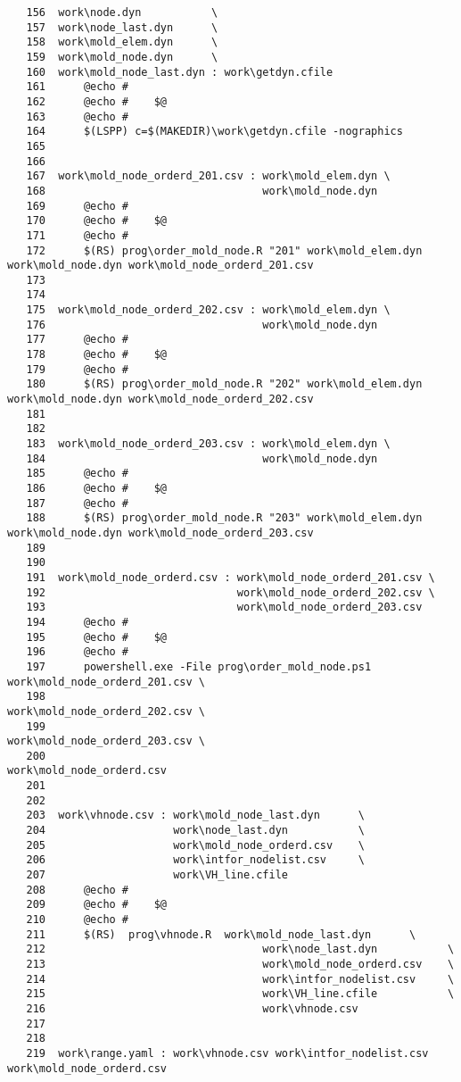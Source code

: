 \documentclass[dvipdfmx]{jsarticle}
\begin{document}
\begin{verbatim}
   156	work\node.dyn           \
   157	work\node_last.dyn      \
   158	work\mold_elem.dyn      \
   159	work\mold_node.dyn      \
   160	work\mold_node_last.dyn : work\getdyn.cfile
   161		@echo #
   162		@echo #    $@
   163		@echo #
   164		$(LSPP) c=$(MAKEDIR)\work\getdyn.cfile -nographics
   165	
   166	
   167	work\mold_node_orderd_201.csv : work\mold_elem.dyn \
   168	                                work\mold_node.dyn
   169		@echo #
   170		@echo #    $@
   171		@echo #
   172		$(RS) prog\order_mold_node.R "201" work\mold_elem.dyn work\mold_node.dyn work\mold_node_orderd_201.csv
   173	
   174	
   175	work\mold_node_orderd_202.csv : work\mold_elem.dyn \
   176	                                work\mold_node.dyn
   177		@echo #
   178		@echo #    $@
   179		@echo #
   180		$(RS) prog\order_mold_node.R "202" work\mold_elem.dyn work\mold_node.dyn work\mold_node_orderd_202.csv
   181	
   182	
   183	work\mold_node_orderd_203.csv : work\mold_elem.dyn \
   184	                                work\mold_node.dyn
   185		@echo #
   186		@echo #    $@
   187		@echo #
   188		$(RS) prog\order_mold_node.R "203" work\mold_elem.dyn work\mold_node.dyn work\mold_node_orderd_203.csv
   189	
   190	
   191	work\mold_node_orderd.csv : work\mold_node_orderd_201.csv \
   192	                            work\mold_node_orderd_202.csv \
   193								work\mold_node_orderd_203.csv
   194		@echo #
   195		@echo #    $@
   196		@echo #
   197		powershell.exe -File prog\order_mold_node.ps1 work\mold_node_orderd_201.csv \
   198	                                                  work\mold_node_orderd_202.csv \
   199	                                                  work\mold_node_orderd_203.csv \
   200	                                                  work\mold_node_orderd.csv
   201	
   202	
   203	work\vhnode.csv : work\mold_node_last.dyn      \
   204	                  work\node_last.dyn           \
   205	                  work\mold_node_orderd.csv    \
   206	                  work\intfor_nodelist.csv     \
   207	                  work\VH_line.cfile
   208		@echo #
   209		@echo #    $@
   210		@echo #
   211		$(RS)  prog\vhnode.R  work\mold_node_last.dyn      \
   212	                                work\node_last.dyn           \
   213	                                work\mold_node_orderd.csv    \
   214	                                work\intfor_nodelist.csv     \
   215	                                work\VH_line.cfile           \
   216	                                work\vhnode.csv
   217	
   218	
   219	work\range.yaml : work\vhnode.csv work\intfor_nodelist.csv work\mold_node_orderd.csv

\end{verbatim}
\end{document}
